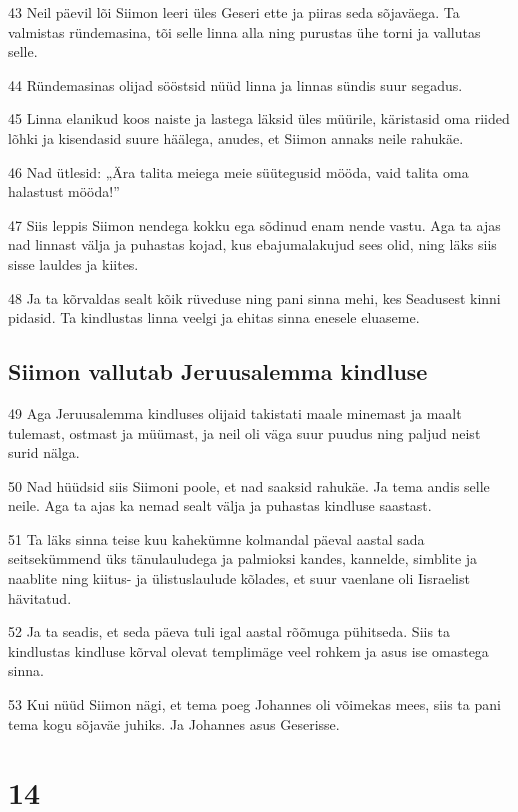 \par 43 Neil päevil lõi Siimon leeri üles Geseri ette ja piiras seda sõjaväega. Ta valmistas ründemasina, tõi selle linna alla ning purustas ühe torni ja vallutas selle.
\par 44 Ründemasinas olijad sööstsid nüüd linna ja linnas sündis suur segadus.
\par 45 Linna elanikud koos naiste ja lastega läksid üles müürile, käristasid oma riided lõhki ja kisendasid suure häälega, anudes, et Siimon annaks neile rahukäe.
\par 46 Nad ütlesid: „Ära talita meiega meie süütegusid mööda, vaid talita oma halastust mööda!”
\par 47 Siis leppis Siimon nendega kokku ega sõdinud enam nende vastu. Aga ta ajas nad linnast välja ja puhastas kojad, kus ebajumalakujud sees olid, ning läks siis sisse lauldes ja kiites.
\par 48 Ja ta kõrvaldas sealt kõik rüveduse ning pani sinna mehi, kes Seadusest kinni pidasid. Ta kindlustas linna veelgi ja ehitas sinna enesele eluaseme. 

\section*{Siimon vallutab Jeruusalemma kindluse}

\par 49 Aga Jeruusalemma kindluses olijaid takistati maale minemast ja maalt tulemast, ostmast ja müümast, ja neil oli väga suur puudus ning paljud neist surid nälga.
\par 50 Nad hüüdsid siis Siimoni poole, et nad saaksid rahukäe. Ja tema andis selle neile. Aga ta ajas ka nemad sealt välja ja puhastas kindluse saastast.
\par 51 Ta läks sinna teise kuu kahekümne kolmandal päeval aastal sada seitsekümmend üks tänulauludega ja palmioksi kandes, kannelde, simblite ja naablite ning kiitus- ja ülistuslaulude kõlades, et suur vaenlane oli Iisraelist hävitatud.
\par 52 Ja ta seadis, et seda päeva tuli igal aastal rõõmuga pühitseda. Siis ta kindlustas kindluse kõrval olevat templimäge veel rohkem ja asus ise omastega sinna.
\par 53 Kui nüüd Siimon nägi, et tema poeg Johannes oli võimekas mees, siis ta pani tema kogu sõjaväe juhiks. Ja Johannes asus Geserisse.

\chapter{14}

